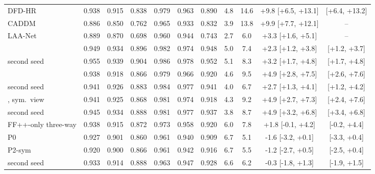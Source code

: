 \begin{tabular}{@{}l ccc ccc cccc@{}}
DFD-HR~\cite{dfdhr2026} & 0.938 & 0.915 & 0.838 & 0.979 & 0.963 & 0.890 & 4.8 & 14.6 & +9.8 [+6.5, +13.1] & [+6.4, +13.2] \\
CADDM~\cite{caddm} & 0.886 & 0.850 & 0.762 & 0.965 & 0.933 & 0.832 & 3.9 & 13.8 & +9.9 [+7.7, +12.1] & -- \\
LAA-Net~\cite{laanet} & 0.889 & 0.870 & 0.698 & 0.960 & 0.944 & 0.743 & 2.7 & 6.0 & +3.3 [+1.6, +5.1] & -- \\
\midrule
\oursB{} & 0.949 & 0.934 & 0.896 & 0.982 & 0.974 & 0.948 & 5.0 & 7.4 & +2.3 [+1.2, +3.8] & [+1.2, +3.7] \\
\quad second seed & 0.955 & 0.939 & 0.904 & 0.986 & 0.978 & 0.952 & 5.1 & 8.3 & +3.2 [+1.7, +4.8] & [+1.7, +4.8] \\
\oursF{} & 0.938 & 0.918 & 0.866 & 0.979 & 0.966 & 0.920 & 4.6 & 9.5 & +4.9 [+2.8, +7.5] & [+2.6, +7.6] \\
\quad second seed & 0.941 & 0.926 & 0.883 & 0.984 & 0.977 & 0.941 & 4.0 & 6.7 & +2.7 [+1.3, +4.1] & [+1.2, +4.2] \\
\oursF{}, sym.\ view & 0.941 & 0.925 & 0.868 & 0.981 & 0.974 & 0.918 & 4.3 & 9.2 & +4.9 [+2.7, +7.3] & [+2.4, +7.6] \\
\quad second seed & 0.945 & 0.934 & 0.888 & 0.981 & 0.977 & 0.937 & 3.8 & 8.7 & +4.9 [+3.2, +6.8] & [+3.4, +6.8] \\
\midrule
FF++-only three-way & 0.938 & 0.915 & 0.872 & 0.973 & 0.958 & 0.920 & 6.0 & 7.8 & +1.8 [-0.1, +4.2] & [-0.2, +4.4] \\
P0 & 0.927 & 0.901 & 0.860 & 0.961 & 0.940 & 0.909 & 6.7 & 5.1 & -1.6 [-3.2, +0.1] & [-3.3, +0.4] \\
P2-sym & 0.920 & 0.900 & 0.866 & 0.961 & 0.942 & 0.916 & 6.7 & 5.5 & -1.2 [-2.7, +0.5] & [-2.5, +0.4] \\
\quad second seed & 0.933 & 0.914 & 0.888 & 0.963 & 0.947 & 0.928 & 6.6 & 6.2 & -0.3 [-1.8, +1.3] & [-1.9, +1.5] \\
\bottomrule
\end{tabular}
